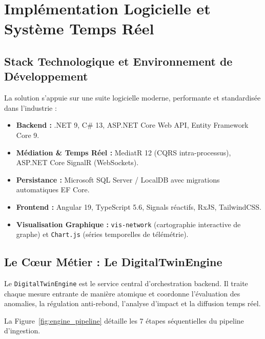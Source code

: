 ﻿\chapter{Implémentation Logicielle et Système Temps Réel}

\section{Stack Technologique et Environnement de Développement}

La solution s'appuie sur une suite logicielle moderne, performante et standardisée dans l'industrie :
\begin{itemize}
    \item \textbf{Backend :} .NET 9, C\# 13, ASP.NET Core Web API, Entity Framework Core 9.
    \item \textbf{Médiation \& Temps Réel :} MediatR 12 (CQRS intra-processus), ASP.NET Core SignalR (WebSockets).
    \item \textbf{Persistance :} Microsoft SQL Server / LocalDB avec migrations automatiques EF Core.
    \item \textbf{Frontend :} Angular 19, TypeScript 5.6, Signals réactifs, RxJS, TailwindCSS.
    \item \textbf{Visualisation Graphique :} \texttt{vis-network} (cartographie interactive de graphe) et \texttt{Chart.js} (séries temporelles de télémétrie).
\end{itemize}

\section{Le Cœur Métier : Le DigitalTwinEngine}

Le \texttt{DigitalTwinEngine} est le service central d'orchestration backend. Il traite chaque mesure entrante de manière atomique et coordonne l'évaluation des anomalies, la régulation anti-rebond, l'analyse d'impact et la diffusion temps réel.

La Figure~\ref{fig:engine_pipeline} détaille les 7 étapes séquentielles du pipeline d'ingestion.

